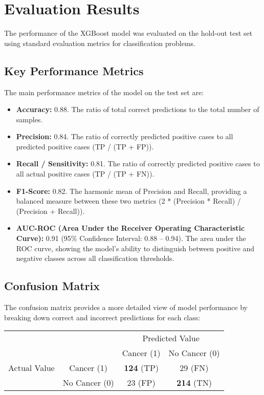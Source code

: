 \section{Evaluation Results}

The performance of the XGBoost model was evaluated on the hold-out test set using standard evaluation metrics for classification problems.

\subsection{Key Performance Metrics}

The main performance metrics of the model on the test set are:
\begin{itemize}
    \item \textbf{Accuracy:} 0.88. The ratio of total correct predictions to the total number of samples.
    \item \textbf{Precision:} 0.84. The ratio of correctly predicted positive cases to all predicted positive cases (TP / (TP + FP)).
    \item \textbf{Recall / Sensitivity:} 0.81. The ratio of correctly predicted positive cases to all actual positive cases (TP / (TP + FN)).
    \item \textbf{F1-Score:} 0.82. The harmonic mean of Precision and Recall, providing a balanced measure between these two metrics (2 * (Precision * Recall) / (Precision + Recall)).
    \item \textbf{AUC-ROC (Area Under the Receiver Operating Characteristic Curve):} 0.91 (95\% Confidence Interval: 0.88 – 0.94). The area under the ROC curve, showing the model's ability to distinguish between positive and negative classes across all classification thresholds.
\end{itemize}

\subsection{Confusion Matrix}

The confusion matrix provides a more detailed view of model performance by breaking down correct and incorrect predictions for each class:

\begin{center}
\begin{tabular}{cc|c|c|}
  & \multicolumn{1}{c}{} & \multicolumn{2}{c}{Predicted Value} \\
  & \multicolumn{1}{c}{} & \multicolumn{1}{c}{Cancer (1)}  & \multicolumn{1}{c}{No Cancer (0)} \\
  \cline{3-4}
Actual Value & Cancer (1) & \textbf{124} (TP) & 29 (FN) \\
  \cline{3-4}
  & No Cancer (0) & 23 (FP) & \textbf{214} (TN) \\
  \cline{3-4}
\end{tabular}
\end{center}

